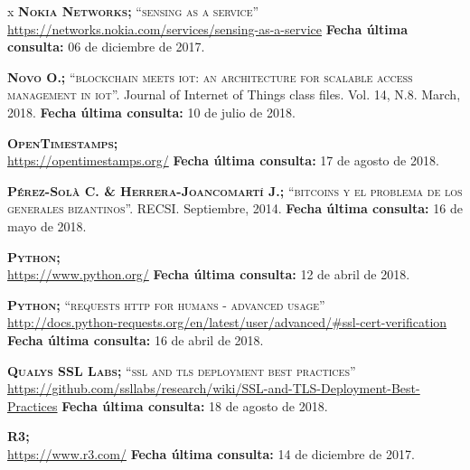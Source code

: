\begin{thebibliography} {x}
	 \textsc{\textbf{Nokia Networks; }}\textsc{“sensing as a service”} \\ 
	\url{https://networks.nokia.com/services/sensing-as-a-service}
	\newline \textbf{Fecha última consulta:} 06 de diciembre de 2017.
		
	 \textsc{\textbf{Novo O.; }} \textsc{“blockchain meets iot: an architecture for scalable access management in iot”.} Journal of Internet of Things class files. Vol. 14, N.8. March, 2018.	
	\newline \textbf{Fecha última consulta:} 10 de julio de 2018.
	
	 \textsc{\textbf{OpenTimestamps; }} \\ 
	\url{https://opentimestamps.org/} 
	\newline \textbf{Fecha última consulta:} 17 de agosto de 2018.		
				
	 \textsc{\textbf{Pérez-Solà C. \& Herrera-Joancomartí J.; }} \textsc{“bitcoins y el problema de los generales bizantinos”.} RECSI. Septiembre, 2014.
	\newline \textbf{Fecha última consulta:} 16 de mayo de 2018.
	
	 \textsc{\textbf{Python; }} \\ 
	\url{https://www.python.org/}
	\newline \textbf{Fecha última consulta:} 12 de abril de 2018.
		
	 \textsc{\textbf{Python; }}\textsc{“requests http for humans - advanced usage”} \\ 
	\url{http://docs.python-requests.org/en/latest/user/advanced/#ssl-cert-verification}
	\newline \textbf{Fecha última consulta:} 16 de abril de 2018.
	
	 \textsc{\textbf{Qualys SSL Labs; }}\textsc{“ssl and tls deployment best practices”} \\
	\url{https://github.com/ssllabs/research/wiki/SSL-and-TLS-Deployment-Best-Practices}
	\newline \textbf{Fecha última consulta:} 18 de agosto de 2018.
		
	 \textsc{\textbf{R3; }} \\
	\url{https://www.r3.com/}
	\newline \textbf{Fecha última consulta:} 14 de diciembre de 2017.
		

\end{thebibliography}

